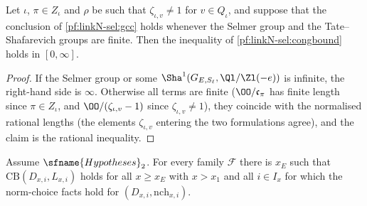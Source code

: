 \begin{lemma}\label{pf:linkN-sel:extended}
Let $\iota$, $\pi\in Z_\iota$ and $\rho$ be such that $\zeta_{\iota,v}\ne1$ for $v\in Q_\iota$, and suppose that the conclusion of
\cref{pf:linkN-sel:gcc} holds whenever the Selmer group and the Tate--Shafarevich groups are finite. Then the inequality of
\cref{pf:linkN-sel:congbound} holds in $[0,\infty]$.
\end{lemma}

\begin{proof}
If the Selmer group or some $\Sha^1(G_{E,S_\ell},\Ql/\Zl(-e))$ is infinite, the right-hand side is $\infty$. Otherwise all terms are finite
($\OO/\mathfrak c_\pi$ has finite length since $\pi\in Z_\iota$, and $\OO/(\zeta_{\iota,v}-1)$ since $\zeta_{\iota,v}\ne1$), they coincide with the
normalised rational lengths (the elements $\zeta_{\iota,v}$ entering the two formulations agree), and the claim is the rational inequality.
\end{proof}

\begin{theorem}\label{pf:linkN-sel:congfam}
Assume $\sfname{Hypotheses}_2$. For every family $\mathcal F$ there is $x_E$ such that $\mathrm{CB}(D_{x,i},L_{x,i})$ holds for all $x\ge x_E$ with
$x>x_1$ and all $i\in I_x$ for which the norm-choice facts hold for $(D_{x,i},\mathrm{nch}_{x,i})$.
\end{theorem}

